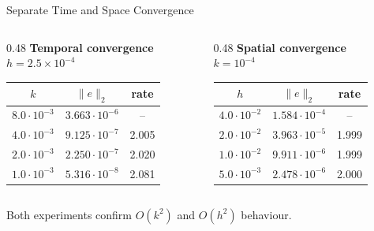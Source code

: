 \documentclass[aspectratio=169,11pt]{beamer}
\begin{document}
\begin{frame}{Separate Time and Space Convergence}
    \begin{columns}[T]
        \begin{column}{0.48\textwidth}
            \textbf{Temporal convergence}\\
            $h=2.5\times10^{-4}$
            \begin{table}
                \scriptsize
                \begin{tabular}{@{}ccc@{}}
                    \toprule
                    $k$ & $\|e\|_2$ & rate \\
                    \midrule
                    $8.0\cdot10^{-3}$ & $3.663\cdot10^{-6}$ & -- \\
                    $4.0\cdot10^{-3}$ & $9.125\cdot10^{-7}$ & 2.005 \\
                    $2.0\cdot10^{-3}$ & $2.250\cdot10^{-7}$ & 2.020 \\
                    $1.0\cdot10^{-3}$ & $5.316\cdot10^{-8}$ & 2.081 \\
                    \bottomrule
                \end{tabular}
            \end{table}
        \end{column}
        \begin{column}{0.48\textwidth}
            \textbf{Spatial convergence}\\
            $k=10^{-4}$
            \begin{table}
                \scriptsize
                \begin{tabular}{@{}ccc@{}}
                    \toprule
                    $h$ & $\|e\|_2$ & rate \\
                    \midrule
                    $4.0\cdot10^{-2}$ & $1.584\cdot10^{-4}$ & -- \\
                    $2.0\cdot10^{-2}$ & $3.963\cdot10^{-5}$ & 1.999 \\
                    $1.0\cdot10^{-2}$ & $9.911\cdot10^{-6}$ & 1.999 \\
                    $5.0\cdot10^{-3}$ & $2.478\cdot10^{-6}$ & 2.000 \\
                    \bottomrule
                \end{tabular}
            \end{table}
        \end{column}
    \end{columns}

    \vspace{0.15cm}
    Both experiments confirm $O(k^2)$ and $O(h^2)$ behaviour.
\end{frame}
\end{document}
